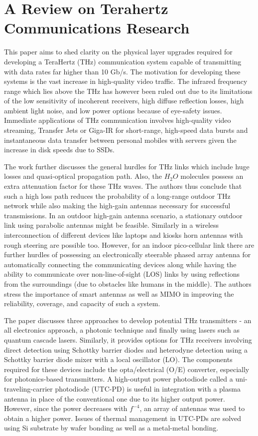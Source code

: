 \documentclass[12pt, letterpaper]{article}
\begin{document}
\section{A Review on Terahertz Communications Research \cite{kleine2011review}} 
\par
This paper aims to shed clarity on the physical layer upgrades required for developing a TeraHertz (THz) communication system capable of transmitting with data rates far higher than 10 Gb/s. The motivation for developing these systems is the vast increase in high-quality video traffic.  The infrared frequency range which lies above the THz has however been ruled out due to its limitations of the low sensitivity of incoherent receivers, high diffuse reflection losses, high ambient light noise, and low power options because of eye-safety issues. Immediate applications of THz communication involves high-quality video streaming, Transfer Jets or Giga-IR for short-range, high-speed data bursts and instantaneous data transfer between personal mobiles with servers given the increase in disk speeds due to SSDs. 
\par
The work further discusses the general hurdles for THz links which include huge losses and quasi-optical propagation path. Also, the $H_2O$ molecules possess an extra attenuation factor for these THz waves. The authors thus conclude that such a high loss path reduces the probability of a long-range outdoor THz network while also making the high-gain antennas necessary for successful transmissions. In an outdoor high-gain antenna scenario, a stationary outdoor link using parabolic antennas might be feasible. Similarly in a wireless interconnection of different devices like laptops and kiosks horn antennas with rough steering are possible too. However, for an indoor pico-cellular link there are further hurdles of possessing an electronically steerable phased array antenna for automatically connecting the communicating devices along while having the ability to communicate over non-line-of-sight (LOS) links by using reflections from the surroundings (due to obstacles like humans in the middle). The authors stress the importance of smart antennas as well as MIMO in improving the reliability, coverage, and capacity of such a system.  
\par
The paper discusses three approaches to develop potential THz transmitters - an all electronics approach, a photonic technique and finally using lasers such as quantum cascade lasers. Similarly, it provides options for THz receivers involving direct detection using Schottky barrier diodes and heterodyne detection using a Schottky barrier diode mixer with a local oscillator (LO). The components required for these devices include the opta/electrical (O/E) converter, especially for photonics-based transmitters. A high-output power photodiode called a uni-traveling-carrier photodiode (UTC-PD) is useful in integration with a plasma antenna in place of the conventional one due to its higher output power. However, since the power decreases with $f^{-4}$, an array of antennas was used to obtain a higher power. Issues of thermal management in UTC-PDs are solved using Si substrate by wafer bonding as well as a metal-metal bonding.
\end{document}
